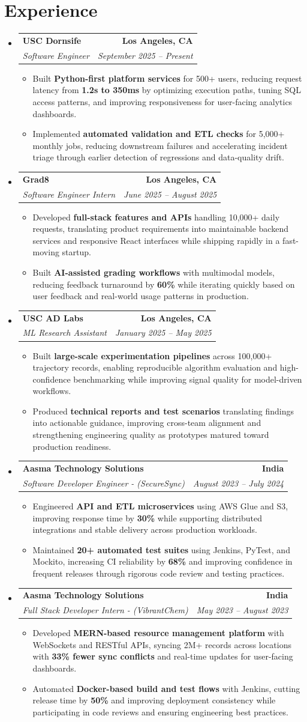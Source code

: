 \documentclass[letterpaper,10pt]{article}
\makeatletter
\newcommand{\resumeItem}[1]{\item\small{{#1 \vspace{-2pt}}}}
\newcommand{\resumeSubheading}[4]{\vspace{-1pt}\item\begin{tabular*}{1.0\textwidth}[t]{l@{\extracolsep{\fill}}r}\textbf{#1} & \textbf{\small #2} \\\textit{\small#3} & \textit{\small #4} \\\end{tabular*}\vspace{-2pt}}
\newcommand{\resumeSubHeadingListStart}{\begin{itemize}[leftmargin=0.0in, label={}]}
\newcommand{\resumeSubHeadingListEnd}{\end{itemize}}
\newcommand{\resumeItemListStart}{\begin{itemize}[leftmargin=0.15in,label=\textbullet,itemsep=2pt,topsep=0pt,parsep=0pt,partopsep=0pt]}
\newcommand{\resumeItemListEnd}{\end{itemize}\vspace{-4pt}}
\makeatother
\begin{document}
\section{Experience}
\resumeSubHeadingListStart
\resumeSubheading{USC Dornsife}{Los Angeles, CA}{Software Engineer}{September 2025 -- Present}
\resumeItemListStart
\resumeItem{Built \textbf{Python-first platform services} for 500+ users, reducing request latency from \textbf{1.2s to 350ms} by optimizing execution paths, tuning SQL access patterns, and improving responsiveness for user-facing analytics dashboards.}
\resumeItem{Implemented \textbf{automated validation and ETL checks} for 5,000+ monthly jobs, reducing downstream failures and accelerating incident triage through earlier detection of regressions and data-quality drift.}
\resumeItemListEnd
\resumeSubheading{Grad8}{Los Angeles, CA}{Software Engineer Intern}{June 2025 -- August 2025}
\resumeItemListStart
\resumeItem{Developed \textbf{full-stack features and APIs} handling 10,000+ daily requests, translating product requirements into maintainable backend services and responsive React interfaces while shipping rapidly in a fast-moving startup.}
\resumeItem{Built \textbf{AI-assisted grading workflows} with multimodal models, reducing feedback turnaround by \textbf{60\%} while iterating quickly based on user feedback and real-world usage patterns in production.}
\resumeItemListEnd
\resumeSubheading{USC AD Labs}{Los Angeles, CA}{ML Research Assistant}{January 2025 -- May 2025}
\resumeItemListStart
\resumeItem{Built \textbf{large-scale experimentation pipelines} across 100,000+ trajectory records, enabling reproducible algorithm evaluation and high-confidence benchmarking while improving signal quality for model-driven workflows.}
\resumeItem{Produced \textbf{technical reports and test scenarios} translating findings into actionable guidance, improving cross-team alignment and strengthening engineering quality as prototypes matured toward production readiness.}
\resumeItemListEnd
\resumeSubheading{Aasma Technology Solutions}{India}{Software Developer Engineer - (SecureSync)}{August 2023 -- July 2024}
\resumeItemListStart
\resumeItem{Engineered \textbf{API and ETL microservices} using AWS Glue and S3, improving response time by \textbf{30\%} while supporting distributed integrations and stable delivery across production workloads.}
\resumeItem{Maintained \textbf{20+ automated test suites} using Jenkins, PyTest, and Mockito, increasing CI reliability by \textbf{68\%} and improving confidence in frequent releases through rigorous code review and testing practices.}
\resumeItemListEnd
\resumeSubheading{Aasma Technology Solutions}{India}{Full Stack Developer Intern - (VibrantChem)}{May 2023 -- August 2023}
\resumeItemListStart
\resumeItem{Developed \textbf{MERN-based resource management platform} with WebSockets and RESTful APIs, syncing 2M+ records across locations with \textbf{33\% fewer sync conflicts} and real-time updates for user-facing dashboards.}
\resumeItem{Automated \textbf{Docker-based build and test flows} with Jenkins, cutting release time by \textbf{50\%} and improving deployment consistency while participating in code reviews and ensuring engineering best practices.}
\resumeItemListEnd
\resumeSubHeadingListEnd
\vspace{-14pt}
\end{document}
